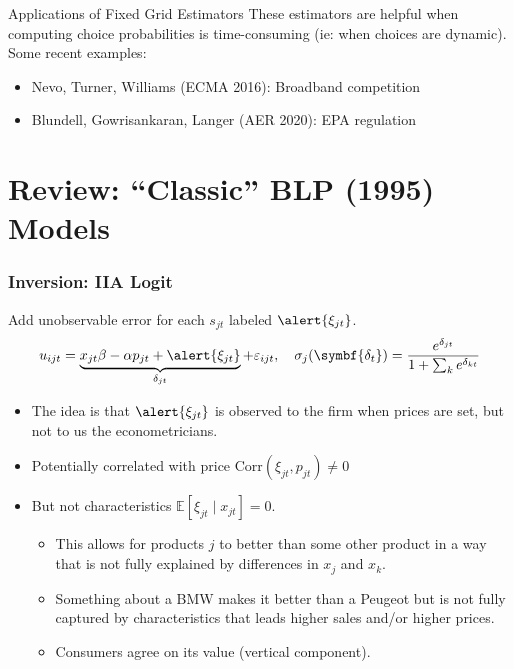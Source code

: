 \documentclass[aspectratio=169,10pt]{beamer}
\begin{document}
\begin{frame}{Applications of Fixed Grid Estimators}
These estimators are helpful when computing choice probabilities is time-consuming (ie: when choices are dynamic). Some recent examples:
\begin{itemize}
    \item Nevo, Turner, Williams (ECMA 2016): Broadband competition
    \item Blundell, Gowrisankaran, Langer (AER 2020): EPA regulation
\end{itemize}
\end{frame}







\section*{Review: ``Classic'' BLP (1995) Models}
\begin{frame}
\frametitle{Inversion: IIA Logit}
Add unobservable error for each $s_{jt}$ labeled $\alert{\xi_{jt}}$.
\begin{align*}
u_{ijt} = \underbrace{x_{jt} \beta -\alpha p_{jt} + \alert{\xi_{jt}}}_{\delta_{jt}} +  \varepsilon_{ijt} , \quad 
\sigma_j(\symbf{\delta_{t}}) = \frac{e^{\delta_{jt}} }{1+\sum_k e^{\delta_{kt}} } 
\end{align*}
\vspace{-0.5cm}
\begin{itemize}
\item The idea is that $\alert{\xi_{jt}}$ is observed to the firm when prices are set, but not to us the econometricians.
\item Potentially correlated with price $\text{Corr}(\xi_{jt},p_{jt}) \neq 0$
\item But not characteristics $\mathbb{E}[\xi_{jt} \mid  x_{jt}]=0$.
\begin{itemize}
\item This allows for products $j$ to better than some other product in a way that is not fully explained by differences in $x_j$ and $x_k$.
\item Something about a BMW makes it better than a Peugeot but is not fully captured by characteristics that leads higher sales and/or higher prices.
\item Consumers agree on its value  (\alert{vertical component}).
\end{itemize}
\end{itemize}
\end{frame}
\end{document}
